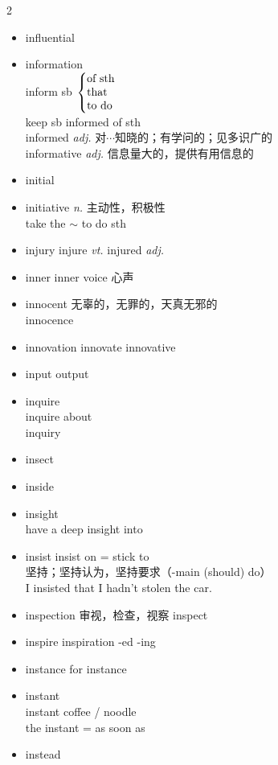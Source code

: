 \documentclass[../../book.tex]{subfiles}
\begin{document}
\begin{multicols}{2}
\begin{itemize}
\item[-] influential
\item[-] information
\\inform sb $\left\{
\begin{array}{@{}l@{}}
\text{of sth} \\
\text{that} \\
\text{to do}
\end{array}
\right.$
\\keep sb informed of sth
\\informed \emph{adj.} 对$\cdots$知晓的；有学问的；见多识广的
\\informative \emph{adj.} 信息量大的，提供有用信息的
\item[-] initial
\item[-] initiative \emph{n.} 主动性，积极性
\\take the $\sim$ to do sth
\item[-] injury \phantom{a} injure \emph{vt.} \phantom{a} injured \emph{adj.}
\item[-] inner \phantom{a} inner voice 心声
\item[-] innocent {\small 无辜的，无罪的，天真无邪的}
\\innocence
\item[-] innovation \phantom{a} innovate innovative
\item[-] input \phantom{a} output
\item[-] inquire
\\inquire about
\\inquiry
\item[-] insect
\item[-] inside
\item[-] insight
\\have a deep insight into
\item[-] insist \phantom{a} insist on = stick to
\\坚持；坚持认为，坚持要求（-main (should) do）
\\I insisted that I hadn\textquoteright t stolen the car.
\item[-] inspection 审视，检查，视察 \phantom{a} inspect
\item[-] inspire \phantom{a} inspiration -ed -ing
\item[-] instance \phantom{a} for instance
\item[-] instant
\\instant coffee / noodle
\\the instant = as soon as
\item[-] instead

\end{itemize}
\end{multicols}
\end{document}
